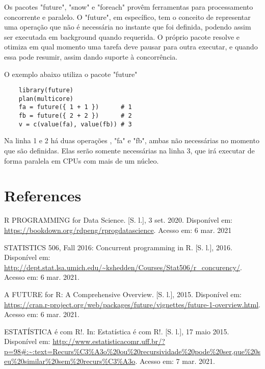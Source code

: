 \documentclass[12pt]{article}
\begin{document}
Os pacotes "future", "snow" e "foreach" provêm ferramentas para processamento concorrente e paralelo. O "future", em específico, tem o conceito de representar uma operação que não é necessária no instante que foi definida, podendo assim ser executada em background quando requerida. O próprio pacote resolve e otimiza em qual momento uma tarefa deve pausar para outra executar, e quando essa pode resumir, assim dando suporte à concorrência. 

O exemplo abaixo utiliza o pacote "future"

\begin{verbatim}
    library(future)
    plan(multicore)
    fa = future({ 1 + 1 })      # 1
    fb = future({ 2 + 2 })      # 2
    v = c(value(fa), value(fb)) # 3
\end{verbatim}

Na linha 1 e 2 há duas operações , "fa" e "fb", ambas não necessárias no momento que são definidas. Elas serão somente necessárias na linha 3, que irá executar de forma paralela em CPUs com mais de um núcleo. 

\section{References}
R PROGRAMMING for Data Science. [S. l.], 3 set. 2020. Disponível em: \url{https://bookdown.org/rdpeng/rprogdatascience}. Acesso em: 6 mar. 2021

STATISTICS 506, Fall 2016: Concurrent programming in R. [S. l.], 2016. Disponível em: \url{http://dept.stat.lsa.umich.edu/~kshedden/Courses/Stat506/r_concurency/}. Acesso em: 6 mar. 2021.

A FUTURE for R: A Comprehensive Overview. [S. l.], 2015. Disponível em: \url{https://cran.r-project.org/web/packages/future/vignettes/future-1-overview.html}. Acesso em: 6 mar. 2021.

ESTATÍSTICA é com R!. In: Estatística é com R!. [S. l.], 17 maio 2015. Disponível em: \url{http://www.estatisticacomr.uff.br/?p=98#:~:text=Recurs%C3%A3o%20ou%20recursividade%20pode%20ser,que%20seu%20similar%20sem%20recurs%C3%A3o}. Acesso em: 7 mar. 2021.
\end{document}
